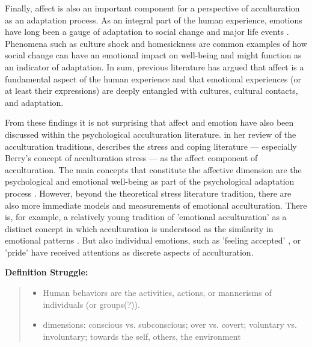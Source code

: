 \documentclass[nobib]{tufte-handout}
\begin{document}
Finally, affect is also an important component for a perspective of acculturation as an adaptation process. As an integral part of the human experience, emotions have long been a gauge of adaptation to social change and major life events \citep[e.g.,][]{Smith1990, Pacella2017}. Phenomena such as culture shock \citep{Ward2001a} and homesickness \citep{VanTilburg1996} are common examples of how social change can have an emotional impact on well-being and might function as an indicator of adaptation. In sum, previous literature has argued that affect is a fundamental aspect of the human experience and that emotional experiences (or at least their expressions) are deeply entangled with cultures, cultural contacts, and adaptation.

From these findings it is not surprising that affect and emotion have also been discussed within the psychological acculturation literature. \citet{Ward2001} in her review of the acculturation traditions, describes the stress and coping literature --- especially Berry's concept of acculturation stress \citep{Berry1997b} --- as the affect component of acculturation. The main concepts that constitute the affective dimension are the psychological and emotional well-being as part of the psychological adaptation process \citep[including, for example life satisfaction and depression][]{Ward2019}. However, beyond the theoretical stress literature tradition, there are also more immediate models and measurements of emotional acculturation. There is, for example, a relatively young tradition of 'emotional acculturation' as a distinct concept in which acculturation is understood as the similarity in emotional patterns \citep[see][for a review]{DeLeersnyder2017}. But also individual emotions, such as 'feeling accepted' \citep{Jasini2018}, or 'pride' \citep{Suinn1995} have received attentions as discrete aspects of acculturation. 

\begin{framed}
    \textbf{Definition Struggle:}\\ 
    \begin{quote}
        \begin{itemize}
            \item Human behaviors are the activities, actions, or mannerisms of individuals (or groups(?)).
            \item dimensions: conscious vs. subconscious; over vs. covert; voluntary vs. involuntary; towards the self, others, the environment 
        \end{itemize}
    \end{quote}
\end{framed}
\end{document}
